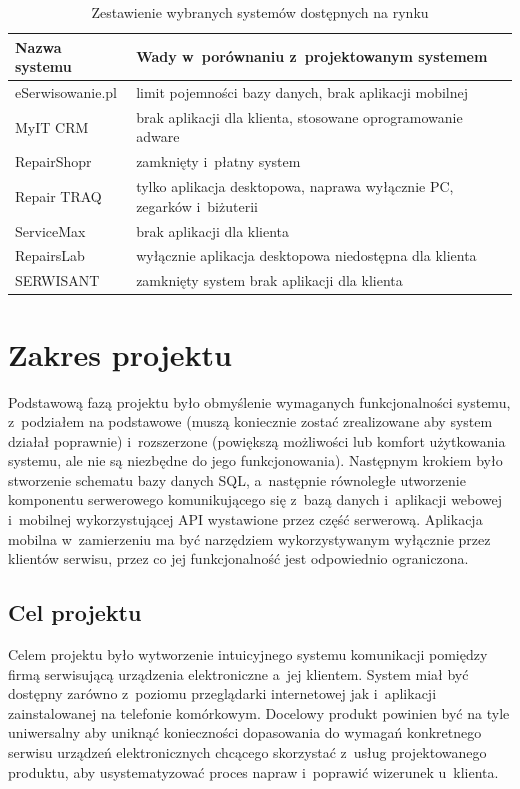 \documentclass[a4paper,11pt]{article}
\begin{document}
\begin{table}[H]
	\centering
	\caption{Zestawienie wybranych systemów dostępnych na rynku}
	\bgroup
	\begin{tabular}{l|l|}
		\hline
		\multicolumn{1}{|l||}{\textbf{Nazwa systemu}} & \textbf{Wady w~porównaniu z~projektowanym systemem}\\ \hline \hline
		\multicolumn{1}{|l||}{eSerwisowanie.pl} & limit pojemności bazy danych, brak aplikacji mobilnej \\ \hline
		\multicolumn{1}{|l||}{MyIT CRM} & brak aplikacji dla klienta, stosowane oprogramowanie adware \\ \hline
		\multicolumn{1}{|l||}{RepairShopr} & zamknięty i~płatny system \\ \hline
		\multicolumn{1}{|l||}{Repair TRAQ} & tylko aplikacja desktopowa, naprawa wyłącznie PC, zegarków i~biżuterii \\ \hline
		\multicolumn{1}{|l||}{ServiceMax} & brak aplikacji dla klienta \\ \hline
		\multicolumn{1}{|l||}{RepairsLab} & wyłącznie aplikacja desktopowa niedostępna dla klienta \\ \hline
		\multicolumn{1}{|l||}{SERWISANT} & zamknięty system brak aplikacji dla klienta \\ \hline
		
		
	\end{tabular}
	\egroup
\end{table}
\section{Zakres projektu}
Podstawową fazą projektu było obmyślenie wymaganych funkcjonalności systemu, z~podziałem na podstawowe (muszą koniecznie zostać zrealizowane aby system działał poprawnie) i~rozszerzone (powiększą możliwości lub komfort użytkowania systemu, ale nie są niezbędne do jego funkcjonowania). Następnym krokiem było stworzenie schematu bazy danych SQL, a~następnie równoległe utworzenie komponentu serwerowego komunikującego się z~bazą danych i~aplikacji webowej i~mobilnej wykorzystującej API wystawione przez część serwerową. Aplikacja mobilna w~zamierzeniu ma być narzędziem wykorzystywanym wyłącznie przez klientów serwisu, przez co jej funkcjonalność jest odpowiednio ograniczona.
\subsection{Cel projektu}
Celem projektu było wytworzenie intuicyjnego systemu komunikacji pomiędzy firmą serwisującą urządzenia elektroniczne a~jej klientem. System miał być dostępny zarówno z~poziomu przeglądarki internetowej jak i~aplikacji zainstalowanej na telefonie komórkowym. Docelowy produkt powinien być na tyle uniwersalny aby uniknąć konieczności dopasowania do wymagań konkretnego serwisu urządzeń elektronicznych chcącego skorzystać z~usług projektowanego produktu, aby usystematyzować proces napraw i~poprawić wizerunek u~klienta.
\end{document}
